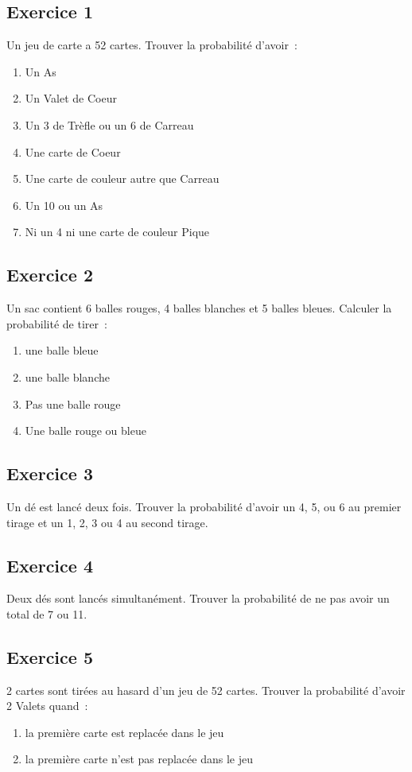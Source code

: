 \documentclass[]{book}
\theoremstyle{definition}
\begin{document}
\subsection*{Exercice 1}
Un jeu de carte a 52 cartes. Trouver la probabilit\'e d'avoir\ :
\begin{enumerate}
\item Un As
\item Un Valet de Coeur
\item Un 3 de Tr\`efle ou un 6 de Carreau
\item Une carte de Coeur
\item Une carte de couleur autre que Carreau
\item Un 10 ou un As
\item Ni un 4 ni une carte de couleur Pique
\end{enumerate}

\subsection*{Exercice 2}
Un sac contient 6 balles rouges, 4 balles blanches et 5 balles bleues. Calculer la probabilit\'e de tirer\ :
\begin{enumerate}
\item une balle bleue
\item une balle blanche
\item Pas une balle rouge
\item Une balle rouge ou bleue
\end{enumerate}

\subsection*{Exercice 3}
Un d\'e est lanc\'e deux fois. Trouver la probabilit\'e d'avoir un 4, 5, ou 6 au premier tirage et un 1, 2, 3 ou 4 au second tirage.

\subsection*{Exercice 4}
Deux d\'es sont lanc\'es simultan\'ement. Trouver la probabilit\'e de ne pas avoir un total de 7 ou 11.

\subsection*{Exercice 5}
2 cartes sont tir\'ees au hasard d'un jeu de 52 cartes. Trouver la probabilit\'e d'avoir 2 Valets quand\ :
\begin{enumerate}
\item la premi\`ere carte est replac\'ee dans le jeu
\item la premi\`ere carte n'est pas replac\'ee dans le jeu
\end{enumerate}
\end{document}
